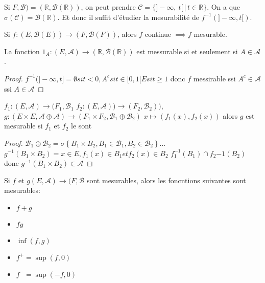 \begin{example}[Application]
	Si $F, \mathscr{B}) = (\mathbb{R}, \mathscr{B}(\mathbb{R}))$, on peut prendre $\mathscr{C} = \{ ]-\infty,\   t[ \, | \, t \in \mathbb{R} \}$. On a que
				$\sigma(\mathscr{C}) = \mathscr{B}(\mathbb{R})$. Et donc il suffit d'étudier la mesurabilité de $f^{-1}(]-\infty, t[)$.
\end{example}


\begin{remarque}
	Si $f : (E,\mathscr{B}(E)) \rightarrow (F,\mathscr{B}(F))$, alors $f$ continue $\implies f$ mesurable.
\end{remarque}


\begin{prop}
	La fonction $\mathscr{1}_A : (E,\mathscr{A}) \rightarrow (\mathbb{R},\mathscr{B}(\mathbb{R}))$ est messurable si et seulement si $A \in \mathscr{A}$.
\end{prop}

\begin{proof}
	$f^{-1}(]-\infty, t] = \emptyset si t < 0, A^c si t \in [0,1[ E si t \geq 1$
	donc $f$ messirable ssi $A^c\in \mathscr{A}$ ssi $A\in \mathscr{A}$
\end{proof}

\begin{prop}
	$f_1 : (E,\mathscr{A}) \rightarrow (F_1,\mathscr{B_1}$
	$f_2 : (E,\mathscr{A})) \rightarrow (F_2,\mathscr{B_2}))$,
	$g: (E \times E,\mathscr{A} \oplus \mathscr{A}) \rightarrow (F_1 \times F_2,\mathscr{B_1} \oplus \mathscr{B_2})$
	$x\mapsto (f_1(x), f_2(x))$
	alors $g$ est mesurable si $f_1$ et $f_2$ le sont
\end{prop}

\begin{proof}

	$\mathscr{B_1} \oplus \mathscr{B_2} = \sigma \left\{ B_1 \times B_2, B_1 \in \mathscr{B_1}, B_2 \in \mathscr{B_2} \right\}...$
	$g^{-1}(B_1 \times B_2) = {x \in E, f_1(x) \in B_1 et f_2(x) \in B_2  }$
	$f_1^{-1}(B_1) \cap f_2{-1}(B_2)$
	donc $g^{-1}(B_1 \times B_2) \in \mathscr{A}$
\end{proof}



\begin{prop}
	Si $f$ et $g (E,\mathscr{A}) \rightarrow (F,\mathscr{B}$
	sont mesurables, alors les foncntions suivantes sont mesurables:
	\begin{itemize}
		\item $f + g$
		\item $fg$
		\item $\inf(f,g)$
		\item $f^+ = \sup(f,0)$
		\item $f^- = \sup(-f,0)$
	\end{itemize}
\end{prop}

